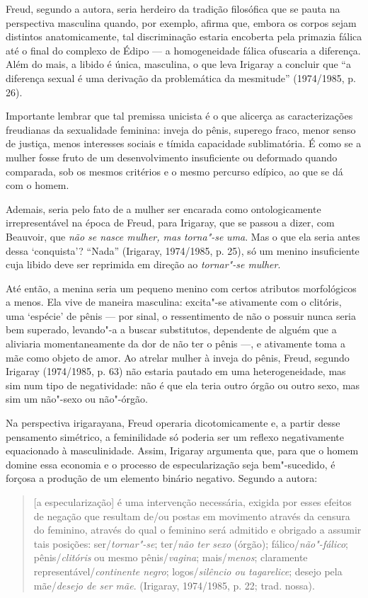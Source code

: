 Freud, segundo a autora, seria herdeiro da tradição filosófica que se
pauta na perspectiva masculina quando, por exemplo, afirma que, embora
os corpos sejam distintos anatomicamente, tal discriminação estaria
encoberta pela primazia fálica até o final do complexo de Édipo --- a
homogeneidade fálica ofuscaria a diferença. Além do mais, a libido é
única, masculina, o que leva Irigaray a concluir que ``a diferença
sexual é uma derivação da problemática da mesmitude'' (1974/1985, p.
26).

Importante lembrar que tal premissa unicista é o que alicerça as
caracterizações freudianas da sexualidade feminina: inveja do pênis,
superego fraco, menor senso de justiça, menos interesses sociais e
tímida capacidade sublimatória. É como se a mulher fosse fruto de um
desenvolvimento insuficiente ou deformado quando comparada, sob os
mesmos critérios e o mesmo percurso edípico, ao que se dá com o homem.

Ademais, seria pelo fato de a mulher ser encarada como ontologicamente
irrepresentável na época de Freud, para Irigaray, que se passou a dizer,
com Beauvoir, que \emph{não se nasce mulher, mas torna"-se} \emph{uma}.
Mas o que ela seria antes dessa `conquista'? ``Nada'' (Irigaray,
1974/1985, p. 25), só um menino insuficiente cuja libido deve ser
reprimida em direção ao \emph{tornar"-se mulher}.

Até então, a menina seria um pequeno menino com certos atributos
morfológicos a menos. Ela vive de maneira masculina: excita"-se
ativamente com o clitóris, uma `espécie' de pênis --- por sinal, o
ressentimento de não o possuir nunca seria bem superado, levando"-a a
buscar substitutos, dependente de alguém que a aliviaria momentaneamente
da dor de não ter o pênis ---, e ativamente toma a mãe como objeto de
amor. Ao atrelar mulher à inveja do pênis, Freud, segundo Irigaray
(1974/1985, p. 63) não estaria pautado em uma heterogeneidade, mas sim
num tipo de negatividade: não é que ela teria outro órgão ou outro sexo,
mas sim um não"-sexo ou não"-órgão.

Na perspectiva irigarayana, Freud operaria dicotomicamente e, a partir
desse pensamento simétrico, a feminilidade só poderia ser um reflexo
negativamente equacionado à masculinidade. Assim, Irigaray argumenta
que, para que o homem domine essa economia e o processo de
especularização seja bem"-sucedido, é forçosa a produção de um elemento
binário negativo. Segundo a autora:

\begin{quote}
{[}a especularização{]} é uma intervenção necessária, exigida por esses
efeitos de negação que resultam de/ou postas em movimento através da
censura do feminino, através do qual o feminino será admitido e obrigado
a assumir tais posições: ser/\emph{tornar"-se}; ter/\emph{não ter sexo}
(órgão); fálico/\emph{não"-fálico}; pênis/\emph{clitóris} ou mesmo
pênis/\emph{vagina}; mais/\emph{menos}; claramente
representável/\emph{continente negro}; logos/\emph{silêncio ou
tagarelice}; desejo pela mãe/\emph{desejo de ser mãe}. (Irigaray,
1974/1985, p. 22; trad. nossa).
\end{quote}

